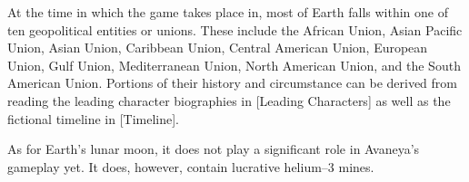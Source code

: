 


At the time in which the game takes place in, most of Earth falls within one of ten geopolitical entities or unions. These include the African Union, Asian Pacific Union, Asian Union, Caribbean Union, Central American Union, European Union, Gulf Union, Mediterranean Union, North American Union, and the South American Union. Portions of their history and circumstance can be derived from reading the leading character biographies in [Leading Characters] as well as the fictional timeline in [Timeline].

As for Earth's lunar moon, it does not play a significant role in Avaneya's gameplay yet. It does, however, contain lucrative helium--3 mines.

